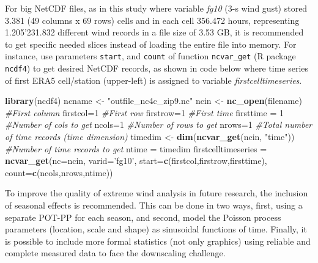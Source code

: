 \documentclass[12pt,oneside]{reedthesis}
\newenvironment{Shaded}{\begin{snugshade}}{\end{snugshade}}
\newcommand{\CommentTok}[1]{\textcolor[rgb]{0.56,0.35,0.01}{\textit{#1}}}
\newcommand{\DataTypeTok}[1]{\textcolor[rgb]{0.13,0.29,0.53}{#1}}
\newcommand{\DecValTok}[1]{\textcolor[rgb]{0.00,0.00,0.81}{#1}}
\newcommand{\KeywordTok}[1]{\textcolor[rgb]{0.13,0.29,0.53}{\textbf{#1}}}
\newcommand{\NormalTok}[1]{#1}
\newcommand{\StringTok}[1]{\textcolor[rgb]{0.31,0.60,0.02}{#1}}
\begin{document}
For big NetCDF files, as in this study where variable \emph{fg10} (3-s wind gust) stored 3.381 (49 columns x 69 rows) cells and in each cell 356.472 hours, representing 1.205'231.832 different wind records in a file size of 3.53 GB, it is recommended to get specific needed slices instead of loading the entire file into memory. For instance, use parameters \texttt{start}, and \texttt{count} of function \texttt{ncvar\_get} (R package \texttt{ncdf4}) to get desired NetCDF records, as shown in code below where time series of first ERA5 cell/station (upper-left) is assigned to variable \emph{firstcelltimeseries}.

\scriptsize

\vspace{0.4cm}
\begin{Shaded}
\begin{Highlighting}[]
    \KeywordTok{library}\NormalTok{(ncdf4)}
\NormalTok{    ncname <-}\StringTok{ "outfile_nc4c_zip9.nc"}
\NormalTok{    ncin <-}\StringTok{ }\KeywordTok{nc_open}\NormalTok{(filename)}
    \CommentTok{#First column}
\NormalTok{      firstcol=}\DecValTok{1}
    \CommentTok{#First row}
\NormalTok{      firstrow=}\DecValTok{1}
    \CommentTok{#First time}
\NormalTok{      firsttime =}\StringTok{ }\DecValTok{1}
    \CommentTok{#Number of cols to get}
\NormalTok{      ncols=}\DecValTok{1}
    \CommentTok{#Number of rows to get}
\NormalTok{      nrows=}\DecValTok{1}
    \CommentTok{#Total number of time records (time dimension)}
\NormalTok{      timedim <-}\StringTok{  }\KeywordTok{dim}\NormalTok{(}\KeywordTok{ncvar_get}\NormalTok{(ncin, }\StringTok{"time"}\NormalTok{))}
    \CommentTok{#Number of time records to get}
\NormalTok{      ntime =}\StringTok{ }\NormalTok{timedim}
\NormalTok{      firstcelltimeseries =}\StringTok{ }\KeywordTok{ncvar_get}\NormalTok{(}\DataTypeTok{nc=}\NormalTok{ncin, }\DataTypeTok{varid=}\StringTok{'fg10'}\NormalTok{, }
                            \DataTypeTok{start=}\KeywordTok{c}\NormalTok{(firstcol,firstrow,firsttime),}
                            \DataTypeTok{count=}\KeywordTok{c}\NormalTok{(ncols,nrows,ntime))}
\end{Highlighting}
\end{Shaded}
\normalsize

To improve the quality of extreme wind analysis in future research, the inclusion of seasonal effects is recommended. This can be done in two ways, first, using a separate POT-PP for each season, and second, model the Poisson process parameters (location, scale and shape) as sinusoidal functions of time. Finally, it is possible to include more formal statistics (not only graphics) using reliable and complete measured data to face the downscaling challenge.
\end{document}
